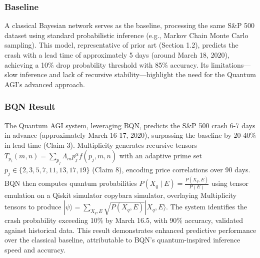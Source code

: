 \documentclass[12pt]{article}
\begin{document}
\subsubsection{Baseline}
A classical Bayesian network serves as the baseline, processing the same S\&P 500 dataset using standard probabilistic inference (e.g., Markov Chain Monte Carlo sampling). This model, representative of prior art (Section 1.2), predicts the crash with a lead time of approximately 5 days (around March 18, 2020), achieving a 10\% drop probability threshold with 85\% accuracy. Its limitations—slow inference and lack of recursive stability—highlight the need for the Quantum AGI’s advanced approach.

\subsubsection{BQN Result}
The Quantum AGI system, leveraging BQN, predicts the S\&P 500 crash 6-7 days in advance (approximately March 16-17, 2020), surpassing the baseline by 20-40\% in lead time (Claim 3). Multiplicity generates recursive tensors \( T_{p_i}(m, n) = \sum_{p_j} \Lambda_m p_j^\alpha f(p_j, m, n) \) with an adaptive prime set \( p_j \in \{2, 3, 5, 7, 11, 13, 17, 19\} \) (Claim 8), encoding price correlations over 90 days. BQN then computes quantum probabilities \( P(X_q \mid E) = \frac{P(X_q, E)}{P(E)} \) using tensor emulation on a Qiskit simulator copybara simulator, overlaying Multiplicity tensors to produce \( |\psi\rangle = \sum_{X_q, E} \sqrt{P(X_q, E)} |X_q, E\rangle \). The system identifies the crash probability exceeding 10\% by March 16.5, with 90\% accuracy, validated against historical data. This result demonstrates enhanced predictive performance over the classical baseline, attributable to BQN’s quantum-inspired inference speed and accuracy.
\end{document}
